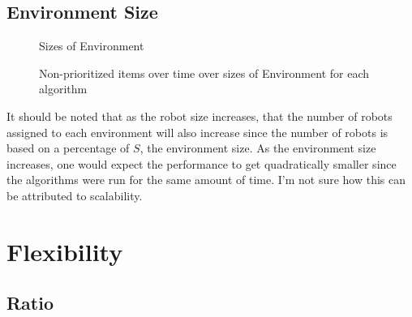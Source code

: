 

\subsection{Environment Size}
\label{results:environmentsize}



\begin{figure}[!htb]
\centering
\resizebox{\textwidth}{!}{}
\caption{Sizes of Environment }
\label{sizegoldplot}
\end{figure}

\begin{figure}[!htb]
\centering
\resizebox{\textwidth}{!}{}
\caption{Non-prioritized items over time over sizes of Environment for each algorithm}
\label{sizewasteplot}
\end{figure}
It should be noted that as the robot size increases, that the number of robots assigned to each environment will also increase since the number of robots is based on a percentage of $S$, the environment size.
As the environment size increases, one would expect the performance to get quadratically smaller since the algorithms were run for the same amount of time. I'm not sure how this can be attributed to scalability. 

\section{Flexibility}
\label{results:flexibility}


\subsection{Ratio}
\label{results:ratio}

